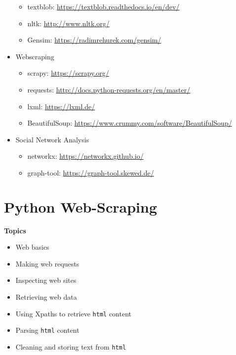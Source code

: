 \documentclass[]{book}
\providecommand{\tightlist}{%
  \setlength{\itemsep}{0pt}\setlength{\parskip}{0pt}}
\begin{document}
\begin{itemize}
  \begin{itemize}
  \tightlist
  \item
    textblob: \url{https://textblob.readthedocs.io/en/dev/}
  \item
    nltk: \url{http://www.nltk.org/}
  \item
    Gensim: \url{https://radimrehurek.com/gensim/}
  \end{itemize}
\item
  Webscraping

  \begin{itemize}
  \tightlist
  \item
    scrapy: \url{https://scrapy.org/}
  \item
    requests: \url{http://docs.python-requests.org/en/master/}
  \item
    lxml: \url{https://lxml.de/}
  \item
    BeautifulSoup: \url{https://www.crummy.com/software/BeautifulSoup/}
  \end{itemize}
\item
  Social Network Analysis

  \begin{itemize}
  \tightlist
  \item
    networkx: \url{https://networkx.github.io/}
  \item
    graph-tool: \url{https://graph-tool.skewed.de/}
  \end{itemize}
\end{itemize}

\hypertarget{python-web-scraping}{%
\chapter{Python Web-Scraping}\label{python-web-scraping}}

\textbf{Topics}

\begin{itemize}
\tightlist
\item
  Web basics
\item
  Making web requests
\item
  Inspecting web sites
\item
  Retrieving web data
\item
  Using Xpaths to retrieve \texttt{html} content
\item
  Parsing \texttt{html} content
\item
  Cleaning and storing text from \texttt{html}
\end{itemize}
\end{document}
